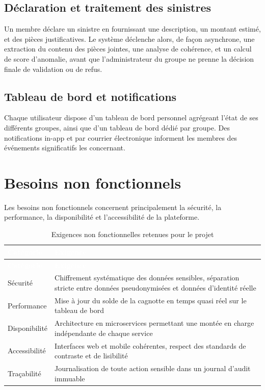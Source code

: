 \documentclass[12pt,a4paper]{report}
\begin{document}
\subsection{Déclaration et traitement des sinistres}
Un membre déclare un sinistre en fournissant une description, un montant estimé, et des pièces justificatives. Le système déclenche alors, de façon asynchrone, une extraction du contenu des pièces jointes, une analyse de cohérence, et un calcul de score d'anomalie, avant que l'administrateur du groupe ne prenne la décision finale de validation ou de refus.

\subsection{Tableau de bord et notifications}
Chaque utilisateur dispose d'un tableau de bord personnel agrégeant l'état de ses différents groupes, ainsi que d'un tableau de bord dédié par groupe. Des notifications in-app et par courrier électronique informent les membres des événements significatifs les concernant.

\section{Besoins non fonctionnels}
Les besoins non fonctionnels concernent principalement la sécurité, la performance, la disponibilité et l'accessibilité de la plateforme.

\begin{longtable}{p{4cm}p{9.5cm}}
\caption{Exigences non fonctionnelles retenues pour le projet}
\label{tab:exigences-nf} \\
\rowcolor{tablehead}
\textcolor{white}{\textbf{Catégorie}} & \textcolor{white}{\textbf{Exigence}} \\
\toprule
\endfirsthead
\rowcolor{tablehead}
\textcolor{white}{\textbf{Catégorie}} & \textcolor{white}{\textbf{Exigence}} \\
\toprule
\endhead
Sécurité & Chiffrement systématique des données sensibles, séparation stricte entre données pseudonymisées et données d'identité réelle \\
Performance & Mise à jour du solde de la cagnotte en temps quasi réel sur le tableau de bord \\
Disponibilité & Architecture en microservices permettant une montée en charge indépendante de chaque service \\
Accessibilité & Interfaces web et mobile cohérentes, respect des standards de contraste et de lisibilité \\
Traçabilité & Journalisation de toute action sensible dans un journal d'audit immuable \\
\bottomrule
\end{longtable}
\end{document}

